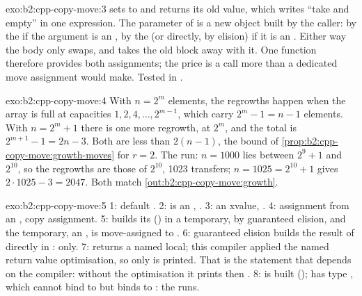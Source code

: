 \begin{solution}{exo:b2:cpp-copy-move:3}
 sets  to  and returns its old value, which writes ``take and empty'' in one
expression. The parameter  of  is a new object built by the caller: by the  if
the argument is an , by the  (or directly, by elision) if it is an . Either way the body
only swaps, and  takes the old block away with it. One function therefore provides both assignments; the
price is a  call more than a dedicated move assignment would make. Tested in
.
\end{solution}

\begin{solution}{exo:b2:cpp-copy-move:4}
With $n = 2^m$ elements, the regrowths happen when the array is full at capacities $1, 2, 4, \dots, 2^{m-1}$, which
carry $2^m - 1 = n - 1$ elements. With $n = 2^m + 1$ there is one more regrowth, at $2^m$, and the total is
$2^{m+1} - 1 = 2n - 3$. Both are less than $2(n-1)$, the bound of \cref{prop:b2:cpp-copy-move:growth-moves} for
$r = 2$. The run: $n = 1000$ lies between $2^9 + 1$ and $2^{10}$, so the regrowths are those of $2^{10}$, 1023
transfers; $n = 1025 = 2^{10} + 1$ gives $2 \cdot 1025 - 3 = 2047$. Both match \cref{out:b2:cpp-copy-move:growth}.
\end{solution}

\begin{solution}{exo:b2:cpp-copy-move:5}
1: default . 2:  is an , . 3: an xvalue, . 4: assignment
from an , copy assignment. 5:  builds its  () in a temporary, by guaranteed
elision, and the temporary, an , is move-assigned to . 6: guaranteed elision builds the result of
 directly in :  only. 7:  returns a named local; this compiler applied
the named return value optimisation, so only  is printed. That is the statement that depends on the
compiler: without the optimisation it prints  then . 8:  is built
();  has type , which cannot bind to  but binds to
: the  runs.
\end{solution}

